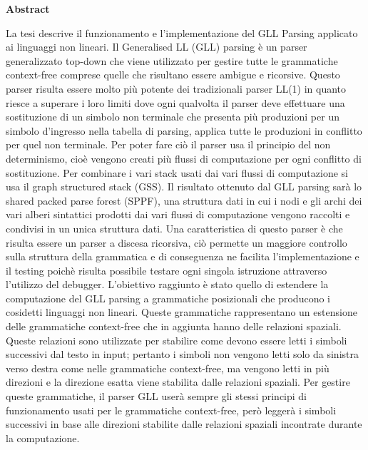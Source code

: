 \documentclass[12pt]{article}
\begin{document}
	\begin{center}
		{\huge\bf Abstract}\par
	\end{center}
	La tesi descrive il funzionamento e l'implementazione del GLL Parsing applicato ai linguaggi non lineari. Il Generalised LL (GLL) parsing è un parser generalizzato top-down che viene utilizzato per gestire tutte le grammatiche context-free comprese quelle che risultano essere ambigue e ricorsive. Questo parser risulta essere molto più potente dei tradizionali parser LL(1) in quanto riesce a superare i loro limiti dove ogni qualvolta il parser deve effettuare una sostituzione di un simbolo non terminale che presenta più produzioni per un simbolo d'ingresso nella tabella di parsing, applica tutte le produzioni in conflitto per quel non terminale. Per poter fare ciò il parser usa il principio del non determinismo, cioè vengono creati più flussi di computazione per ogni conflitto di sostituzione. Per combinare i vari stack usati dai vari flussi di computazione si usa il graph structured stack (GSS). Il risultato ottenuto dal GLL parsing sarà lo shared packed parse forest (SPPF), una struttura dati in cui i nodi e gli archi dei vari alberi sintattici prodotti dai vari flussi di computazione vengono raccolti e condivisi in un unica struttura dati. Una caratteristica di questo parser è che risulta essere un parser a discesa ricorsiva, ciò permette un maggiore controllo sulla struttura della grammatica e di conseguenza ne facilita l'implementazione e il testing poichè risulta possibile testare ogni singola istruzione attraverso l'utilizzo del debugger. L'obiettivo raggiunto è stato quello di estendere la computazione del GLL parsing a grammatiche posizionali che producono i cosidetti linguaggi non lineari. Queste grammatiche rappresentano un estensione delle grammatiche context-free che in aggiunta hanno delle relazioni spaziali. Queste relazioni sono utilizzate per stabilire come devono essere letti i simboli successivi dal testo in input; pertanto i simboli non vengono letti solo da sinistra verso destra come nelle grammatiche context-free, ma vengono letti in più direzioni e la direzione esatta viene stabilita dalle relazioni spaziali. Per gestire queste grammatiche, il parser GLL userà sempre gli stessi principi di funzionamento usati per le grammatiche context-free, però leggerà i simboli successivi in base alle direzioni stabilite dalle relazioni spaziali incontrate durante la computazione.
\end{document}
